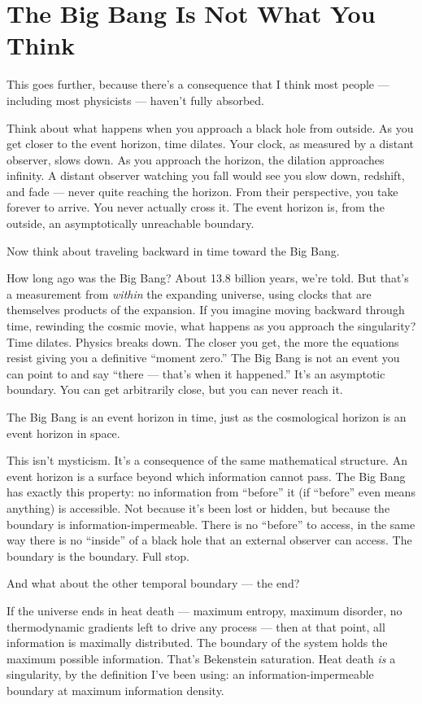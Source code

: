 \documentclass[11pt, twoside, openright]{book}
\begin{document}
\section*{The Big Bang Is Not What You Think}

This goes further, because there's a consequence that I think most people --- including most physicists --- haven't fully absorbed.

Think about what happens when you approach a black hole from outside. As you get closer to the event horizon, time dilates. Your clock, as measured by a distant observer, slows down. As you approach the horizon, the dilation approaches infinity. A distant observer watching you fall would see you slow down, redshift, and fade --- never quite reaching the horizon. From their perspective, you take forever to arrive. You never actually cross it. The event horizon is, from the outside, an asymptotically unreachable boundary.

Now think about traveling backward in time toward the Big Bang.

How long ago was the Big Bang? About 13.8 billion years, we're told. But that's a measurement from \textit{within} the expanding universe, using clocks that are themselves products of the expansion. If you imagine moving backward through time, rewinding the cosmic movie, what happens as you approach the singularity? Time dilates. Physics breaks down. The closer you get, the more the equations resist giving you a definitive ``moment zero.'' The Big Bang is not an event you can point to and say ``there --- that's when it happened.'' It's an asymptotic boundary. You can get arbitrarily close, but you can never reach it.

The Big Bang is an event horizon in time, just as the cosmological horizon is an event horizon in space.

This isn't mysticism. It's a consequence of the same mathematical structure. An event horizon is a surface beyond which information cannot pass. The Big Bang has exactly this property: no information from ``before'' it (if ``before'' even means anything) is accessible. Not because it's been lost or hidden, but because the boundary is information-impermeable. There is no ``before'' to access, in the same way there is no ``inside'' of a black hole that an external observer can access. The boundary is the boundary. Full stop.

And what about the other temporal boundary --- the end?

If the universe ends in heat death --- maximum entropy, maximum disorder, no thermodynamic gradients left to drive any process --- then at that point, all information is maximally distributed. The boundary of the system holds the maximum possible information. That's Bekenstein saturation. Heat death \textit{is} a singularity, by the definition I've been using: an information-impermeable boundary at maximum information density.
\end{document}
